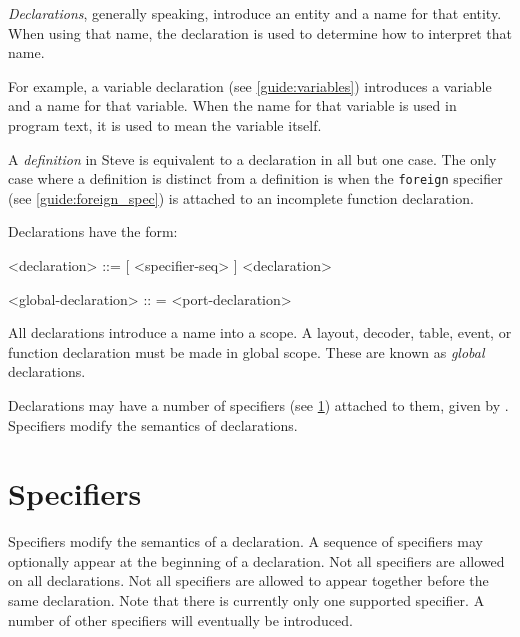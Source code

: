 \textit{Declarations}, generally speaking, introduce an entity and a name for that entity. When using that name, the declaration is used to determine how to interpret that name. 

For example, a variable declaration (see \ref{guide:variables}) introduces a variable and a name for that variable. When the name for that variable is used in program text, it is used to mean the variable itself.

A \textit{definition} in Steve is equivalent to a declaration in all but one case. The only case where a definition is distinct from a definition is when the \texttt{foreign} specifier (see \ref{guide:foreign_spec}) is attached to an incomplete function declaration.

Declarations have the form:

\begin{minip}
\begin{grammar}
<declaration> ::=
[ <specifier-seq> ] <declaration>

<global-declaration> :: =
<port-declaration>
\end{grammar}
\end{minip}

All declarations introduce a name into a scope. A layout, decoder, table, event, or function declaration must be made in global scope. These are known as \textit{global} declarations.

Declarations may have a number of specifiers (see \ref{guide:specifications}) attached to them, given by . Specifiers modify the semantics of declarations.

\section{Specifiers} \label{guide:specifications}

Specifiers modify the semantics of a declaration. A sequence of specifiers may optionally appear at the beginning of a declaration. Not all specifiers are allowed on all declarations. Not all specifiers are allowed to appear together before the same declaration. Note that there is currently only one supported specifier. A number of other specifiers will eventually be introduced.

